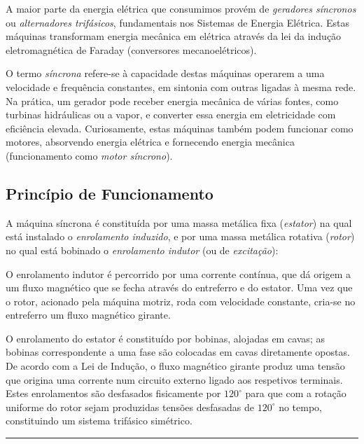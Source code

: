 
A maior parte da energia elétrica que consumimos provém de \textit{geradores síncronos} ou \textit{alternadores trifásicos}, fundamentais nos Sistemas de Energia Elétrica. Estas máquinas transformam energia mecânica em elétrica através da lei da indução eletromagnética de Faraday (conversores mecanoelétricos).

O termo \textit{síncrona} refere-se à capacidade destas máquinas operarem a uma velocidade e frequência constantes, em sintonia com outras ligadas à mesma rede. Na prática, um gerador pode receber energia mecânica de várias fontes, como turbinas hidráulicas ou a vapor, e converter essa energia em eletricidade com eficiência elevada. Curiosamente, estas máquinas também podem funcionar como motores, absorvendo energia elétrica e fornecendo energia mecânica (funcionamento como \textit{motor síncrono}).

\subsection{Princípio de Funcionamento}

A máquina síncrona é constituída por uma massa metálica fixa (\textit{estator}) na qual está instalado o \textit{enrolamento induzido}, e por uma massa metálica rotativa (\textit{rotor}) no qual está bobinado o \textit{enrolamento indutor} (ou de \textit{excitação}):

O enrolamento indutor é percorrido por uma corrente contínua, que dá origem a um fluxo magnético que se fecha através do entreferro e do estator. Uma vez que o rotor, acionado pela máquina motriz, roda com velocidade constante, cria-se no entreferro um fluxo magnético girante.

O enrolamento do estator é constituído por bobinas, alojadas em cavas; as bobinas correspondente a uma fase são colocadas em cavas diretamente opostas. De acordo com a Lei de Indução, o fluxo magnético girante produz uma tensão que origina uma corrente num circuito externo ligado aos respetivos terminais. Estes enrolamentos são desfasados fisicamente por $120^{\circ}$ para que com a rotação uniforme do rotor sejam produzidas tensões desfasadas de $120^{\circ}$ no tempo, constituindo um sistema trifásico simétrico.

\vspace{0.5em}\hrule\vspace{0.5em}%

